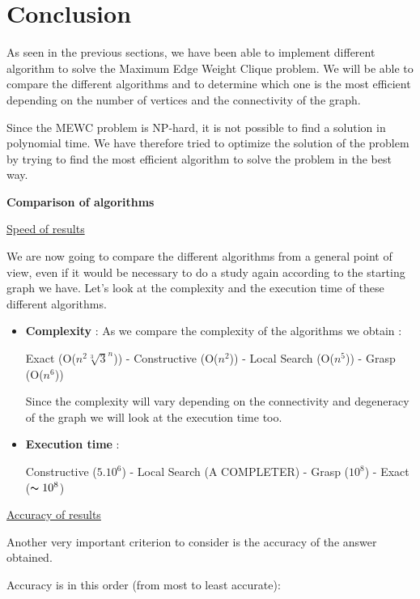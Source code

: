 
\section{Conclusion}

As seen in the previous sections, we have been able to implement different
algorithm to solve the Maximum Edge Weight Clique problem. We will be able to
compare the different algorithms and to determine which one is the most
efficient depending on the number of vertices and the connectivity of the graph.
\bigskip

Since the MEWC problem is NP-hard, it is not possible to find a solution in
polynomial time. We have therefore tried to optimize the solution of the problem
by trying to find the most efficient algorithm to solve the problem in the best
way.
\bigskip

\large\textbf{Comparison of algorithms} \newline 

\underline{Speed of results}\bigskip

We are now going to compare the different algorithms from a general point of view, even if it would be necessary to do a study again according to the starting graph we have.
Let's look at the complexity and the execution time of these different algorithms.

\begin{itemize}
    \item \textbf{Complexity} : As we compare the complexity of the algorithms we obtain : \bigskip
    
Exact (O($n^2\sqrt[3]{3}^n$)) - Constructive (O($n^2$)) - Local Search (O($n^5$)) - Grasp (O($n^6$)) \bigskip
    
    Since the complexity will vary depending on the connectivity and degeneracy of the graph we will look at the execution time too.
    
    \item \textbf{Execution time} : \bigskip
    
Constructive ($5.10^6$) -  Local Search (A COMPLETER) - Grasp ($10^8$) - Exact ($\thicksim 10^8$) 
\end{itemize}
\underline{Accuracy of results}\bigskip 

Another very important criterion to consider is the accuracy of the answer obtained. \bigskip 

Accuracy is in this order (from most to least accurate):

